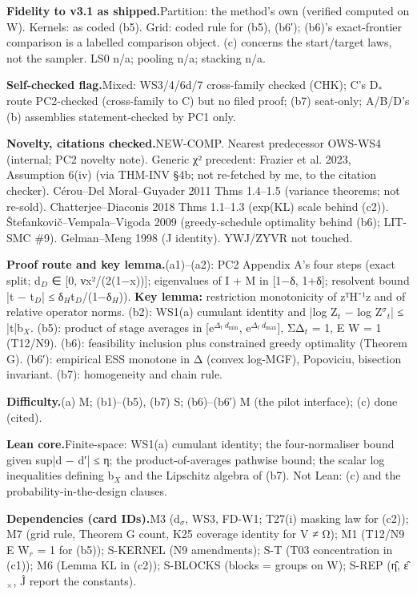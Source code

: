 {\par\smallskip\noindent\textbf{Fidelity to v3.1 as shipped.}\enspace Partition: the method's own (verified computed on W). Kernels: as coded (b5). Grid: coded rule for (b5), (b6′); (b6)'s exact-frontier comparison is a labelled comparison object. (c) concerns the start/target laws, not the sampler. LS0 n/a; pooling n/a; stacking n/a.
\par\smallskip\noindent\textbf{Self-checked flag.}\enspace Mixed: WS3/4/6d/7 cross-family checked (CHK); C's D$_{*}$ route PC2-checked (cross-family to C) but no filed proof; (b7) seat-only; A/B/D's (b) assemblies statement-checked by PC1 only.
\par\smallskip\noindent\textbf{Novelty, citations checked.}\enspace NEW-COMP. Nearest predecessor OWS-WS4 (internal; PC2 novelty note). Generic χ² precedent: Frazier et al. 2023, Assumption 6(iv) (via THM-INV §4b; not re-fetched by me, to the citation checker). Cérou–Del Moral–Guyader 2011 Thms 1.4–1.5 (variance theorems; not re-sold). Chatterjee–Diaconis 2018 Thms 1.1–1.3 (exp(KL) scale behind (c2)). Štefankovič–Vempala–Vigoda 2009 (greedy-schedule optimality behind (b6); LIT-SMC \#9). Gelman–Meng 1998 (J identity). YWJ/ZYVR not touched.
\par\smallskip\noindent\textbf{Proof route and key lemma.}\enspace (a1)–(a2): PC2 Appendix A's four steps (exact split; d$_{D}$ ∈ [0, νx²/(2(1−x))]; eigenvalues of I + M in [1−δ, 1+δ]; resolvent bound |t − t$_{D}$| ≤ δ$_{H}$t$_{D}$/(1−δ$_{H}$)). \textbf{Key lemma:} restriction monotonicity of zᵀH⁻¹z and of relative operator norms. (b2): WS1(a) cumulant identity and |log Z$_{t}$ − log Z$^{σ}$$_{t}$| ≤ |t|b$_{X}$. (b5): product of stage averages in [e$^{Δ_{t}\ d_{\mathrm{min}}}$, e$^{Δ_{t}\ d_{\mathrm{max}}}$], ΣΔ$_{t}$ = 1, E W = 1 (T12/N9). (b6): feasibility inclusion plus constrained greedy optimality (Theorem G). (b6′): empirical ESS monotone in Δ (convex log-MGF), Popoviciu, bisection invariant. (b7): homogeneity and chain rule.
\par\smallskip\noindent\textbf{Difficulty.}\enspace (a) M; (b1)–(b5), (b7) S; (b6)–(b6′) M (the pilot interface); (c) done (cited).
\par\smallskip\noindent\textbf{Lean core.}\enspace Finite-space: WS1(a) cumulant identity; the four-normaliser bound given sup|d − d′| ≤ η; the product-of-averages pathwise bound; the scalar log inequalities defining b$_{X}$ and the Lipschitz algebra of (b7). Not Lean: (c) and the probability-in-the-design clauses.
\par\smallskip\noindent\textbf{Dependencies (card IDs).}\enspace M3 (d$_{σ}$, WS3, FD-W1; T27(i) masking law for (c2)); M7 (grid rule, Theorem G count, K25 coverage identity for V ≠ Ω); M1 (T12/N9 E W$_{r}$ = 1 for (b5)); S-KERNEL (N9 amendments); S-T (T03 concentration in (c1)); M6 (Lemma KL in (c2)); S-BLOCKS (blocks = groups on W); S-REP (η̂, ε̂$_{×}$, Ĵ report the constants).
$$}
